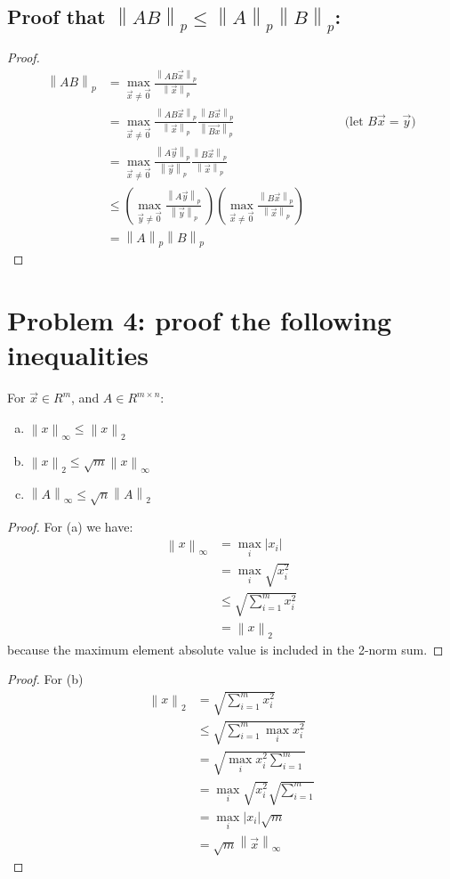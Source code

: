 \documentclass[10pt]{article}
\newcommand{\norm}[1]{\left\lVert#1\right\rVert_p}
\newcommand{\normi}[1]{\left\lVert#1\right\rVert_\infty}
\newcommand{\normt}[1]{\left\lVert#1\right\rVert_2}
\begin{document}
\subsection{Proof that $\norm{AB} \leq \norm{A}\norm{B}$:}
\begin{proof}
  \begin{align*}
    \norm{AB} &=  \max_{\vec{x}\neq \vec{0}}\frac{\norm{AB\vec{x}}}{\norm{\vec{x}}} \\
              &=  \max_{\vec{x}\neq \vec{0}}\frac{\norm{AB\vec{x}}}{\norm{\vec{x}}}\frac{\norm{B\vec{x}}}{\norm{\vec{Bx}}} && &&\text{(let $B\vec{x}=\vec{y}$)}\\
              &=  \max_{\vec{x}\neq \vec{0}}\frac{\norm{A\vec{y}}}{\norm{\vec{y}}}\frac{\norm{B\vec{x}}}{\norm{\vec{x}}} \\
              &\leq  \left(\max_{\vec{y}\neq \vec{0}}\frac{\norm{A\vec{y}}}{\norm{\vec{y}}}\ \right) \left(\max_{\vec{x}\neq \vec{0}} \frac{\norm{B\vec{x}}}{\norm{\vec{x}}} \right) \\ 
              &= \norm{A}\norm{B}
  \end{align*}
\end{proof}

\section{Problem 4: proof the following inequalities}
For $\vec{x} \in R^m$, and $A\in R^{m\times n}$:

\begin{enumerate}[(a)] %
\item $\normi{x} \leq \normt{x}$
\item $\normt{x} \leq \sqrt{m} \normi{x}$
\item $\normi{A} \leq \sqrt{n}\normt{A}$
\end{enumerate}

\begin{proof}
For (a) we have:
 \begin{align*}
    \normi{x} &= \max_i |x_i| \\
              &= \max_i \sqrt{x_i^2} \\
              &\leq \sqrt{\sum_{i=1}^{m} x_i^2}\\
              &= \normt{x}
 \end{align*}
  because the maximum element absolute value is included in the 2-norm sum.
\end{proof}

\begin{proof}
For (b)
 \begin{align*}
    \normt{x} &= \sqrt{\sum_{i=1}^{m} x_i^2} \\
              &\leq  \sqrt{\sum_{i=1}^{m} \max_i x_i^2} \\
              &= \sqrt{\max_i x_i^2 \sum_{i=1}^m} \\
              &= \max_i \sqrt{ x_i^2} \sqrt{\sum_{i=1}^m}\\
              &= \max_i |x_i| \sqrt{m} \\
              &= \sqrt{m}\normi{\vec{x}} 
 \end{align*}
\end{proof}
\end{document}
